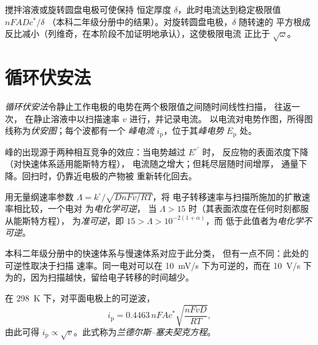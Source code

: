 搅拌溶液或旋转圆盘电极可使保持
恒定厚度 $\delta$，此时电流达到稳定极限值 $nFADc^*/\delta$
（本科二年级分册中的结果）。对旋转圆盘电极，$\delta$ 随转速的
平方根成反比减小（列维奇，在本阶段不加证明地承认），这使极限电流
正比于 $\sqrt\omega$。

\section{循环伏安法}

\begin{definition}[循环伏安法]\label{def:b3:electrode-kinetics:cv}
\emph{循环伏安法}令静止工作电极的电势在两个极限值之间随时间线性扫描，
往返一次，
在静止溶液中以扫描速率 $v$ 进行，并记录电流。
以电流对电势作图，所得图线称为\emph{伏安图}；每个波都有一个
\emph{峰电流} $i_{\mathrm p}$，位于其\emph{峰电势}
$E_{\mathrm p}$ 处。
\end{definition}

峰的出现源于两种相互竞争的效应：当电势越过 $E^{\circ\prime}$ 时，
反应物的表面浓度下降（对快速体系适用能斯特方程），
电流随之增大；但耗尽层随时间增厚，
通量下降。回扫时，仍靠近电极的产物被
重新转化回去。

\begin{definition}[可逆性]\label{def:b3:electrode-kinetics:reversibility}
用无量纲速率参数 $\Lambda = k^\circ/\sqrt{DnFv/RT}$，将
电子转移速率与扫描所施加的扩散速率相比较，一个电对
为\emph{电化学可逆}，
当 $\Lambda > 15$ 时（其表面浓度在任何时刻都服从能斯特方程），
为\emph{准可逆}，即 $15 >
\Lambda > 10^{-2(1 + \alpha)}$，而
低于此值者为\emph{电化学不可逆}。
\end{definition}

\begin{remark}
本科二年级分册中的快速体系与慢速体系对应于此分类，
但有一点不同：此处的可逆性取决于扫描
速率。同一电对可以在 \qty{10}{mV/s} 下为可逆的，而在
\qty{10}{V/s} 下为的，因为扫描越快，留给电子转移的时间越少。
\end{remark}

\begin{proposition}\label{prop:b3:electrode-kinetics:randles-sevcik}
在 \qty{298}{K} 下，对平面电极上的可逆波，
\[
  i_{\mathrm p} = 0.4463\,nFAc^*\sqrt{\frac{nFvD}{RT}},
\]
由此可得 $i_{\mathrm p} \propto \sqrt v$。此式称为\emph{兰德尔斯–塞夫契克方程}。
\end{proposition}

